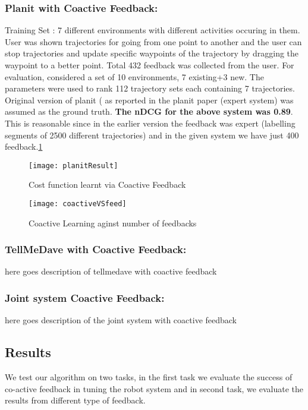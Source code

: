 	\subsubsection{Planit with Coactive Feedback:} 
		Training Set : 7 different environments with different activities occuring in them. User was shown trajectories for going from one point to another and the user can stop trajectories and update specific waypoints of the trajectory by dragging the waypoint to a better point. Total 432 feedback was collected from the user. For evaluation, considered a set of 10 environments, 7 existing+3 new. The parameters were used to rank 112 trajectory sets each containing 7 trajectories. Original version of planit ( as reported in the planit paper (expert system) was assumed as the ground truth. \textbf{The nDCG for the above system was 0.89}. This is reasonable since in the earlier version the feedback was expert (labelling segments of 2500 different trajectories) and in the given system we have just 400 feedback.\ref{fig:planitResult} 
		\begin{figure}[h]
		\texttt{[image: planitResult]}
		\centering
		\caption{Cost function learnt via Coactive Feedback}
  		\label{fig:planitResult}
		\end{figure}


		\begin{figure}[h]
		\texttt{[image: coactiveVSfeed]}
		\centering
		\caption{Coactive Learning aginst number of feedbacks}
  		\label{fig:c1}
		\end{figure}
	\subsubsection{TellMeDave with Coactive Feedback:} 
		here goes description of tellmedave with coactive feedback

	\subsubsection{Joint system Coactive Feedback:}
		here goes description of the joint system with coactive feedback


\subsection{Results} 
We test our algorithm on two tasks, in the first task we evaluate the success of co-active feedback in tuning the robot system and in second task, we evaluate the results from different type of feedback.

